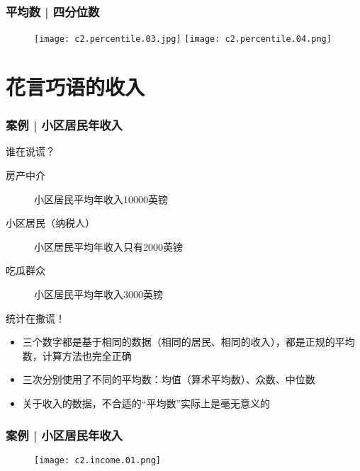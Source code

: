 \begin{frame}
  \frametitle{平均数 | 四分位数}
  \begin{figure}
    \centering
    \texttt{[image: c2.percentile.03.jpg]}
    \texttt{[image: c2.percentile.04.png]}
  \end{figure}
\end{frame}

\section{花言巧语的收入}
\begin{frame}
  \frametitle{案例 | 小区居民年收入}
  \begin{block}{谁在说谎？}
    \begin{description}
      \item[房产中介] 小区居民平均年收入10000英镑
      \item[小区居民（纳税人）] 小区居民平均年收入只有2000英镑
      \item[吃瓜群众] 小区居民平均年收入3000英镑
    \end{description}
  \end{block}
  \pause \pause \pause \pause
  \begin{block}{统计在撒谎！}
    \begin{itemize}
      \item 三个数字都是基于相同的数据（相同的居民、相同的收入），都是正规的平均数，计算方法也完全正确
      \item 三次分别使用了不同的平均数：均值（算术平均数）、众数、中位数
      \item 关于收入的数据，不合适的“平均数”实际上是毫无意义的
    \end{itemize}
  \end{block}
\end{frame}

\begin{frame}
  \frametitle{案例 | 小区居民年收入}
  \begin{figure}
    \centering
    \texttt{[image: c2.income.01.png]}
  \end{figure}
\end{frame}

